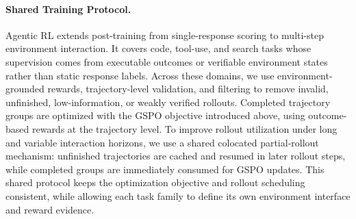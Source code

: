 \documentclass{llmxive}
\begin{document}


\paragraph{Shared Training Protocol.}
Agentic RL extends post-training from single-response scoring to multi-step environment interaction. It covers code, tool-use, and search tasks whose supervision comes from executable outcomes or verifiable environment states rather than static response labels. Across these domains, we use environment-grounded rewards, trajectory-level validation, and filtering to remove invalid, unfinished, low-information, or weakly verified rollouts. Completed trajectory groups are optimized with the GSPO objective introduced above, using outcome-based rewards at the trajectory level. To improve rollout utilization under long and variable interaction horizons, we use a shared colocated partial-rollout mechanism: unfinished trajectories are cached and resumed in later rollout steps, while completed groups are immediately consumed for GSPO updates. This shared protocol keeps the optimization objective and rollout scheduling consistent, while allowing each task family to define its own environment interface and reward evidence.
\end{document}
